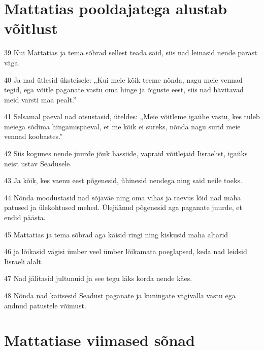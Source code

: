 \section*{Mattatias pooldajatega alustab võitlust}

\par 39 Kui Mattatias ja tema sõbrad sellest teada said, siis nad leinasid nende pärast väga.
\par 40 Ja nad ütlesid üksteisele: „Kui meie kõik teeme nõnda, nagu meie vennad tegid, ega võitle paganate vastu oma hinge ja õiguste eest, siis nad hävitavad meid varsti maa pealt.”
\par 41 Selsamal päeval nad otsustasid, üteldes: „Meie võitleme igaühe vastu, kes tuleb meiega sõdima hingamispäeval, et me kõik ei sureks, nõnda nagu surid meie vennad koobastes.”
\par 42 Siis kogunes nende juurde jõuk hassiide, vapraid võitlejaid Iisraelist, igaüks neist ustav Seadusele.
\par 43 Ja kõik, kes vaenu eest põgenesid, ühinesid nendega ning said neile toeks.
\par 44 Nõnda moodustasid nad sõjaväe ning oma vihas ja raevus lõid nad maha patused ja ülekohtused mehed. Ülejäänud põgenesid aga paganate juurde, et endid päästa.
\par 45 Mattatias ja tema sõbrad aga käisid ringi ning kiskusid maha altarid
\par 46 ja lõikasid vägisi ümber veel ümber lõikamata poeglapsed, keda nad leidsid Iisraeli alalt.
\par 47 Nad jälitasid jultunuid ja see tegu läks korda nende käes.
\par 48 Nõnda nad kaitsesid Seadust paganate ja kuningate vägivalla vastu ega andnud patustele võimust. 

\section*{Mattatiase viimased sõnad}

